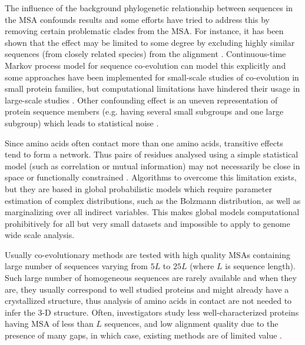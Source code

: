 The influence of the background phylogenetic relationship between sequences in the MSA confounds results and some efforts have tried to address this by removing certain problematic clades from the MSA.
For instance, it has been shown that the effect may be limited to some degree by excluding highly similar sequences (from closely related species) from the alignment \cite{wollenberg2000separation}.
Continuous-time Markov process model for sequence co‐evolution can model this explicitly and some approaches have been implemented for small-scale studies of co‐evolution in small protein families, but computational limitations have hindered their usage in large-scale studies \cite{de2013emerging}.
Other confounding effect is an uneven representation of protein sequence members (e.g. having several small subgroups and one large subgroup) which leads to statistical noise \cite{marks2012protein}.

Since amino acids often contact more than one amino acids, transitive effects tend to form a network.
Thus pairs of residues analysed using a simple statistical model (such as correlation or mutual information) may not necessarily be close in space or functionally constrained \cite{marks2012protein}.
Algorithms to overcome this limitation exists, but they are based in global probabilistic models which require parameter estimation of complex distributions, such as the Bolzmann distribution, as well as marginalizing over all indirect variables.
This makes global models computational prohibitively for all but very small datasets and impossible to apply to genome wide scale analysis.

Usually co-evolutionary methods are tested with high quality MSAs containing large number of sequences varying from $5L$ to $25L$ (where $L$ is  sequence length).
Such large number of homogeneous sequences are rarely available and when they are, they usually correspond to well studied proteins and might already have a crystallized structure, thus analysis of amino acids in contact are not needed to infer the 3-D structure.
Often, investigators study less well-characterized proteins having MSA of less than $L$ sequences, and low alignment quality due to the presence of many gaps, in which case, existing methods are of limited value \cite{clark2014multidimensional}.

